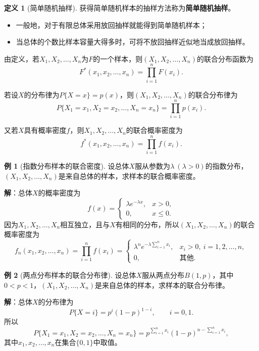 \documentclass[11pt,a4paper]{report}
\theoremstyle{definition}
\newtheorem{definition}{定义}[chapter]
\newtheorem{example}{例}[chapter]
\begin{document}
\begin{definition}[简单随机抽样]
获得简单随机样本的抽样方法称为\textbf{简单随机抽样}。
\begin{itemize}[leftmargin=2em]
    \item 一般地，对于有限总体采用放回抽样就能得到简单随机样本；
    \item 当总体的个数比样本容量大得多时，可将不放回抽样近似地当成放回抽样。
\end{itemize}
\end{definition}

由定义，若$X_{1},X_{2},\ldots,X_{n}$为$F$的一个样本，则$(X_{1},X_{2},\ldots,X_{n})$的联合分布函数为
\[
F^{*}(x_{1},x_{2},\ldots,x_{n})=\prod_{i=1}^{n}F(x_{i}).
\]

若设$X$的分布律为$P\{X=x\}=p(x)$，则$(X_{1},X_{2},\ldots,X_{n})$的联合分布律为
\[
P\{X_{1}=x_{1},X_{2}=x_{2},\ldots,X_{n}=x_{n}\}=\prod_{i=1}^{n}p(x_{i}).
\]

又若$X$具有概率密度$f$，则$X_{1},X_{2},\ldots,X_{n}$的联合概率密度为
\[
f^{*}(x_{1},x_{2},\ldots,x_{n})=\prod_{i=1}^{n}f(x_{i}).
\]

\begin{example}[指数分布样本的联合密度]
设总体$X$服从参数为$\lambda\ (\lambda>0)$的指数分布，$(X_{1},X_{2},\ldots,X_{n})$是来自总体的样本，求样本的联合概率密度。

\textbf{解}：总体$X$的概率密度为
\[
f(x)=
\begin{cases}
\lambda e^{-\lambda x}, & x>0,\\[0.3em]
0, & x\leq 0.
\end{cases}
\]
因为$X_{1},X_{2},\ldots,X_{n}$相互独立，且与$X$有相同的分布，所以$(X_{1},X_{2},\ldots,X_{n})$的联合概率密度为
\[
f_{n}(x_{1},x_{2},\ldots,x_{n})=\prod_{i=1}^{n}f(x_{i})=
\begin{cases}
\lambda^{n}e^{-\lambda\sum_{i=1}^{n}x_{i}}, & x_{i}>0,\ i=1,2,\ldots,n,\\[0.3em]
0, & \text{其他}.
\end{cases}
\]
\end{example}

\begin{example}[两点分布样本的联合分布律]
设总体$X$服从两点分布$B(1,p)$，其中$0<p<1$，$(X_{1},X_{2},\ldots,X_{n})$是来自总体的样本，求样本的联合分布律。

\textbf{解}：总体$X$的分布律为
\[
P\{X=i\}=p^{i}(1-p)^{1-i},\qquad i=0,1.
\]
所以
\[
P\{X_{1}=x_{1},X_{2}=x_{2},\ldots,X_{n}=x_{n}\}=p^{\sum_{i=1}^{n}x_{i}}(1-p)^{n-\sum_{i=1}^{n}x_{i}},
\]
其中$x_{1},x_{2},\ldots,x_{n}$在集合$\{0,1\}$中取值。
\end{example}
\end{document}
